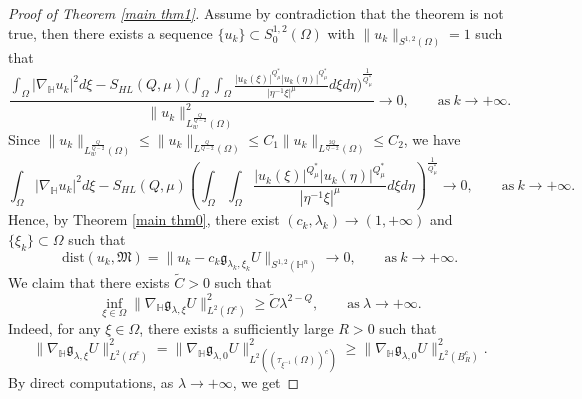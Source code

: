 \documentclass[11pt]{article}
\begin{document}
\begin{proof}
[Proof of Theorem \ref{main thm1}]
Assume by contradiction that the theorem is not true, then there exists a sequence  $\{u_k\}\subset S_0^{1,2}(\Omega)$ with $\|u_k\|_{S^{1,2}(\Omega)}=1$ such that
\begin{equation*}%
  \frac{\int_{\Omega}|\nabla_{\mathbb{H}} u_k|^{2}{d}\xi-S_{HL}(Q,\mu)	\Big(\int_{\Omega}\int_{\Omega}\frac{|u_k(\xi)|^{Q^{\ast}_{\mu}}|u_k(\eta)|
^{Q^{\ast}_{\mu}}}{|\eta^{-1}\xi|^{\mu}}{d}\xi{d}\eta\Big)^{\frac{1}{Q^{\ast}_{\mu}}}}
{\|u_k\|_{L^{\frac{Q}{Q-2}}_w(\Omega)}^2}\longrightarrow0,\qquad \mathrm{as} ~k\rightarrow+\infty.
\end{equation*}
Since $\|u_k\|_{L^{\frac{Q}{Q-2}}_w(\Omega)}\leq \|u_k\|_{L^{\frac{Q}{Q-2}}(\Omega)}\leq C_1\|u_k\|_{L^{\frac{2Q}{Q-2}}(\Omega)}\leq C_2$, we have
\begin{equation*}
  \int_{\Omega}|\nabla_{\mathbb{H}} u_k|^{2}{d}\xi-S_{HL}(Q,\mu)	\left(\int_{\Omega}\int_{\Omega}\frac{|u_k(\xi)|^{Q^{\ast}_{\mu}}|u_k(\eta)|
^{Q^{\ast}_{\mu}}}{|\eta^{-1}\xi|^{\mu}}{d}\xi{d}\eta\right)^{\frac{1}{Q^{\ast}_{\mu}}}\longrightarrow0,\qquad \mathrm{as} ~k\rightarrow+\infty.
\end{equation*}
Hence, by Theorem \ref{main thm0}, there exist $(c_k,\lambda_k)\rightarrow (1,+\infty)$ and $\{\xi_k\}\subset \Omega$ such that
\begin{equation}\label{weaknorm1}
  \mathrm{dist}(u_k,\mathfrak{M})=\|u_k-c_k\mathfrak{g}_{\lambda_k,\xi_k}U\|_{S^{1,2}(\mathbb{H}^{n})}
  \rightarrow0,\qquad \mathrm{as} ~k\rightarrow+\infty.
\end{equation}
We claim that there exists $\widetilde{C}>0$ such that
\begin{equation*}
  \inf\limits_{\xi\in \Omega}\|\nabla_\mathbb{H}\mathfrak{g}_{\lambda,\xi}U\|^2_{L^2(\Omega^c)}\geq \widetilde{C}\lambda^{2-Q},\qquad \mathrm{as} ~\lambda\rightarrow+\infty.
\end{equation*}
Indeed, for any $\xi\in \Omega$, there exists a sufficiently large $R>0$ such that
\begin{equation*}
  \|\nabla_\mathbb{H}\mathfrak{g}_{\lambda,\xi}U\|^2_{L^2(\Omega^c)}=\|\nabla_\mathbb{H}\mathfrak{g}_{\lambda,0}U\|^2
  _{L^2((\tau_{\xi^{-1}}(\Omega))^c)}\geq \|\nabla_\mathbb{H}\mathfrak{g}_{\lambda,0}U\|^2_{L^2(B_R^c)}.
\end{equation*}
By direct computations, as $\lambda\rightarrow+\infty$, we get

\end{proof}
\end{document}

